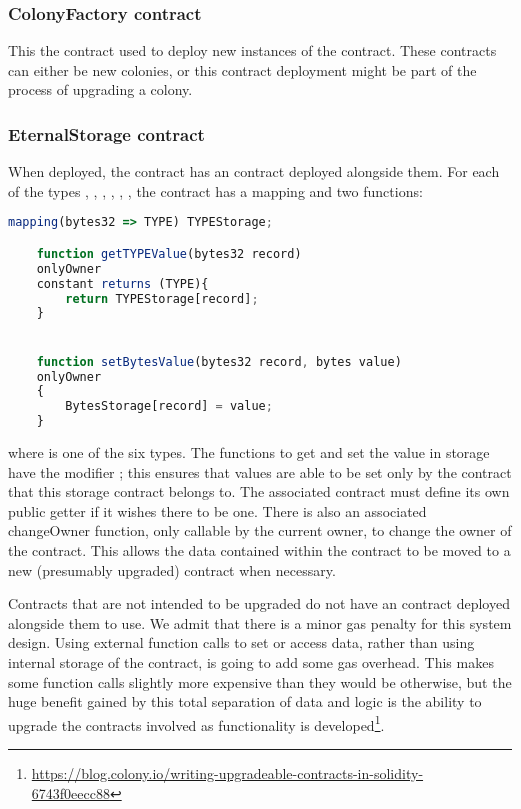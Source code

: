 \subsubsection {ColonyFactory contract}
This the contract used to deploy new instances of the  contract. These contracts can either be new colonies, or this contract deployment might be part of the process of upgrading a colony.

\subsubsection {EternalStorage contract}

When deployed, the   contract has an  contract deployed alongside them. For each of the types , , , , , , the  contract has a mapping and two functions:

\begin{minipage}[c]{0.9\linewidth}
\begin{lstlisting}[language=JavaScript]
    mapping(bytes32 => TYPE) TYPEStorage;

    function getTYPEValue(bytes32 record)
    onlyOwner 
    constant returns (TYPE){
        return TYPEStorage[record];
    }


    function setBytesValue(bytes32 record, bytes value)
    onlyOwner
    {
        BytesStorage[record] = value;
    }
\end{lstlisting}
\end{minipage}

\noindent where  is one of the six types. The functions to get and set the value in storage have the modifier ; this ensures that values are able to be set only by the contract that this storage contract belongs to. The associated contract must define its own public getter if it wishes there to be one. There is also an associated changeOwner function, only callable by the current owner, to change the owner of the contract. This allows the data contained within the contract to be moved to a new (presumably upgraded) contract when necessary. 

Contracts that are not intended to be upgraded do not have an  contract deployed alongside them to use. We admit that there is a minor gas penalty for this system design. Using external function calls to set or access data, rather than using internal storage of the contract, is going to add some gas overhead. This makes some function calls slightly more expensive than they would be otherwise, but the huge benefit gained by this total separation of data and logic is the ability to upgrade the contracts involved as functionality is developed\footnote{\url{https://blog.colony.io/writing-upgradeable-contracts-in-solidity-6743f0eecc88}}. 

